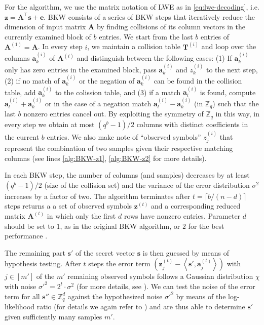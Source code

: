For the algorithm, we use the matrix notation of LWE as in \cref{eq:lwe-decoding}, i.e. $\mathbf{z} = \mathbf{A}^\intercal \mathbf{s} + \mathbf{e}$. BKW consists of a series of BKW steps that iteratively reduce the dimension of input matrix $\mathbf{A}$ by finding collisions of its column vectors in the currently examined block of $b$ entries. We start from the last $b$ entries of $\mathbf{A}^{(1)} = \mathbf{A}$. In every step $i$, we maintain a collision table $\mathbf{T}^{(i)}$ and loop over the columns $\mathbf{a}_k^{(i)}$ of $\mathbf{A}^{(i)}$ and distinguish between the following cases: (1) If $\mathbf{a}_k^{(i)}$ only has zero entries in the examined block, pass $\mathbf{a}_k^{(i)}$ and $z_k^{(i)}$ to the next step, (2) if no match of $\mathbf{a}_k^{(i)}$ or the negation of $\mathbf{a}_k^{(i)}$ can be found in the collision table, add $\mathbf{a}_k^{(i)}$ to the colission table, and (3) if a match $\mathbf{a}_l^{(i)}$ is found, compute $\mathbf{a}_l^{(i)} + \mathbf{a}_k^{(i)}$ or in the case of a negation match $\mathbf{a}_l^{(i)} - \mathbf{a}_k^{(i)}$ (in $\mathbb{Z}_q$) such that the last $b$ nonzero entries cancel out. By exploiting the symmetry of $\mathbb{Z}_q$ in this way, in every step we obtain at most $(q^b - 1)/2$ columns with distinct coefficients in the current $b$ entries. We also make note of ``observed symbols'' $z_j^{(i)}$ that represent the combination of two samples given their respective matching columns (see lines \ref{alg:BKW-z1}, \ref{alg:BKW-z2} for more details).

In each BKW step, the number of columns (and samples) decreases by at least $(q^b - 1)/2$ (size of the collision set) and the variance of the error distribution $\sigma^2$ increases by a factor of two. The algorithm terminates after $t = \lceil b / (n - d)\rceil$ steps returns a a set of observed symbols $\mathbf{z}^{(t)}$ and a corresponding reduced matrix $\mathbf{A}^{(t)}$ in which only the first $d$ rows have nonzero entries. Parameter $d$ should be set to $1$, as in the original BKW algorithm, or $2$ for the best performance \cite{ACFFP15a}.

The remaining part $\mathbf{s}'$ of the secret vector $\mathbf{s}$ is then guessed by means of hypothesis testing. After $t$ steps the error term $\left(\mathbf{z}_j^{(t)} - \left\langle \mathbf{s}', \mathbf{a}_j^{(t)}\right\rangle\right)$ with $j \in [m']$ of the $m'$ remaining observed symbols follows a Gaussian distribution $\chi$ with noise $\sigma'^2 = 2^t\cdot \sigma^2$ (for more details, see \cite[Lemma~1]{ACFFP15a}). %
We can test the noise of the error term for all $\mathbf{s}'' \in \mathbb{Z}_q^d$ against the hypothesized noise  $\sigma'^2$ by means of the log-likelihood ratio (for details we again refer to \cite{ACFFP15a}) and are thus able to determine $\mathbf{s}'$ given sufficiently many samples $m'$.

